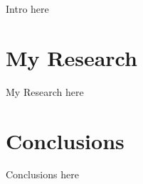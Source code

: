 \documentclass{beamer}
\begin{document}




\begin{frame}
  Intro here
\end{frame}

\section{My Research}

\begin{frame}
  My Research here
\end{frame}

\section{Conclusions}

\begin{frame}
  Conclusions here 
\end{frame}
\end{document}

